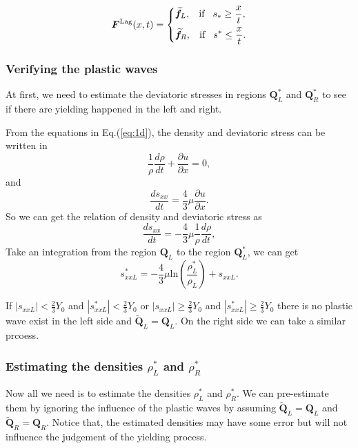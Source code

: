 \documentclass{article}
\theoremstyle{plain}\newtheorem{definition}{\sc{Definition}}
\theoremstyle{defination}\newtheorem{example}{Example}[section]
\numberwithin{equation}{section}
\numberwithin{table}{section}
\begin{document}
\begin{equation}
	\bm{F}^{\text{Lag}}(x,t) = \left\{ \begin{aligned}
		& \widetilde{\bm{f}}_L, \hspace{0.3cm} \text{if} \hspace{0.3cm} s_*\ge \frac{x}{t},\\
		& \widetilde{\bm{f}}_R, \hspace{0.3cm} \text{if} \hspace{0.3cm} s^*\le \frac{x}{t}.\\
	  \end{aligned}
	\right.
  \end{equation}

  \subsubsection{ Verifying the plastic waves}
  At first, we need to estimate  the deviatoric stresses in regions $\bm{Q}_L^*$ and $\bm{Q}_R^*$ to see if there are yielding happened in the left and right.
  
  From the equations in Eq.(\ref{eq:1d}), the density and deviatoric stress can be written in 
  \begin{equation}
	\frac{1}{\rho}\frac{d\rho}{dt}+\frac{\partial u}{\partial x} =0,
  \end{equation}
  and
  \begin{equation}
	\frac{ds_{xx}}{dt}=\frac{4}{3}\mu\frac{\partial u}{\partial x}.
  \end{equation}
So we can get the relation of density and deviatoric stress as
  \begin{equation}
	\frac{ds_{xx}}{dt}=-\frac{4}{3}\mu \frac{1}{\rho}\frac{d\rho}{dt},
\end{equation}
Take an integration from  the region $\bm{Q}_L$ to  the region $\bm{Q}_L^*$, we can get 
 \begin{equation}
	s_{xxL}^*=-\frac{4}{3}\mu\text{ln}(\frac{\rho_L^*}{\rho_L})+s_{xxL}.
\end{equation}

If $|s_{xxL}|< \frac{2}{3}Y_0$ and  $|s_{xxL}^*|< \frac{2}{3}Y_0$ or  $|s_{xxL}| \ge \frac{2}{3}Y_0$ and  $|s_{xxL}^*|\ge \frac{2}{3}Y_0$ there is no plastic wave exist in the left side and $\widetilde{\bm{Q}}_L = \bm{Q}_L$.  On the right side we can take a similar prcoess.

\subsubsection{ Estimating the densities $\rho_L^*$ and  $\rho_R^*$ }
Now all we need is to estimate the densities $\rho_L^*$ and $\rho_R^*$. We can pre-estimate them by ignoring the influence of the plastic waves by assuming $\widetilde{\bm{Q}}_L = \bm{Q}_L$ and $\widetilde{\bm{Q}}_R = \bm{Q}_R$. Notice that, the estimated densities may have some error but will not influence the judgement of the yielding process.
\end{document}
